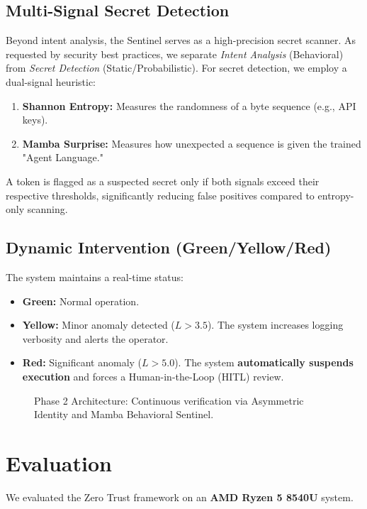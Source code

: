 \documentclass[conference]{IEEEtran}
\begin{document}
\subsection{Multi-Signal Secret Detection}
Beyond intent analysis, the Sentinel serves as a high-precision secret scanner. As requested by security best practices, we separate \textit{Intent Analysis} (Behavioral) from \textit{Secret Detection} (Static/Probabilistic). 
For secret detection, we employ a dual-signal heuristic:
\begin{enumerate}
    \item \textbf{Shannon Entropy:} Measures the randomness of a byte sequence (e.g., API keys).
    \item \textbf{Mamba Surprise:} Measures how unexpected a sequence is given the trained "Agent Language."
\end{enumerate}
A token is flagged as a suspected secret only if both signals exceed their respective thresholds, significantly reducing false positives compared to entropy-only scanning.

\subsection{Dynamic Intervention (Green/Yellow/Red)}
The system maintains a real-time status:
\begin{itemize}
    \item \textbf{Green:} Normal operation.
    \item \textbf{Yellow:} Minor anomaly detected ($L > 3.5$). The system increases logging verbosity and alerts the operator.
    \item \textbf{Red:} Significant anomaly ($L > 5.0$). The system \textbf{automatically suspends execution} and forces a Human-in-the-Loop (HITL) review.
\end{itemize}

\begin{figure}[htbp]
\centering
\resizebox{\columnwidth}{!}{
    
}
\caption{Phase 2 Architecture: Continuous verification via Asymmetric Identity and Mamba Behavioral Sentinel.}
\label{fig:zt_arch}
\end{figure}

\section{Evaluation}
We evaluated the Zero Trust framework on an \textbf{AMD Ryzen 5 8540U} system.
\end{document}
